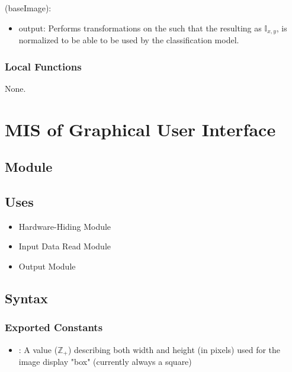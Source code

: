 \documentclass[12pt, titlepage]{article}
\begin{document}
\noindent {}(baseImage):
\begin{itemize} 
\item output: Performs transformations on the  such that the resulting  
as $\mathbb{I}_{x, y}$, is normalized to be able to be used by the classification model.
\end{itemize}

\subsubsection{Local Functions}

None.

\section{MIS of Graphical User Interface} \label{ModuleGUI} 

\subsection{Module}

 

\subsection{Uses}

\begin{itemize}
  \item Hardware-Hiding Module 
  \item Input Data Read Module 
  \item Output Module  
\end{itemize}

\subsection{Syntax}

\subsubsection{Exported Constants}

\begin{itemize}
  \item {}: A value ($\mathbb{Z}_{+}$) describing both width and height (in pixels) used for the image
  display "box" (currently always a square)
\end{itemize}
\end{document}
